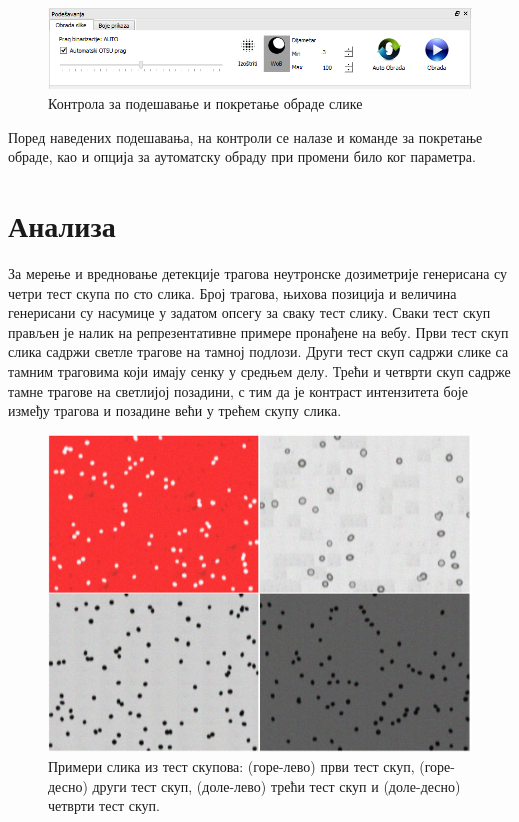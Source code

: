 \documentclass[12pt,a4paper,serbian,oneside]{book}
\begin{document}
\begin{figure}[H]
\begin{center}
\includegraphics[width=150mm]{images/processing.png}
\end{center}
\caption{Контрола за подешавање и покретање обраде слике}
\label{fig:processing}
\end{figure}

Поред наведених подешавања, на контроли се налазе и команде за покретање обраде, као и опција за аутоматску обраду при промени било ког параметра.

%
%
%

\chapter{Анализа}

За мерење и вредновање детекције трагова неутронске дозиметрије генерисана су четри тест скупа по сто слика. Број трагова, њихова позиција и величина генерисани су насумице у задатом опсегу за сваку тест слику. Сваки тест скуп прављен је налик на репрезентативне примере пронађене на вебу. Први тест скуп слика садржи светле трагове на тамној подлози. Други тест скуп садржи слике са тамним траговима који имају сенку у средњем делу. Трећи и четврти скуп садрже тамне трагове на светлијој позадини, с тим да је контраст интензитета боје између трагова и позадине већи у трећем скупу слика.

\begin{figure}[h]
\begin{center}
\includegraphics[width=150mm]{images/test.png}
\end{center}
\caption{Примери слика из тест скупова: (горе-лево) први тест скуп, (горе-десно) други тест скуп, (доле-лево) трећи тест скуп и (доле-десно) четврти тест скуп.}
\label{fig:test}
\end{figure}
\end{document}
